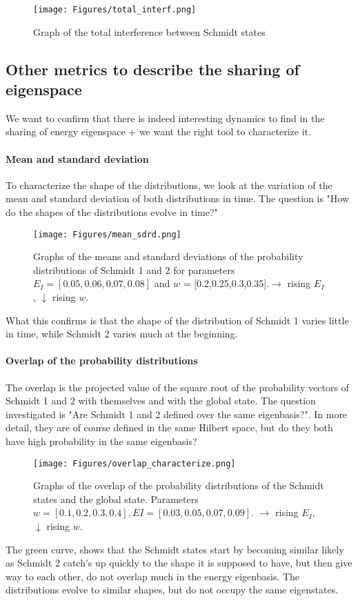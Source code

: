 \documentclass{article}
\begin{document}
\begin{figure}[h]
    \centering
    \texttt{[image: Figures/total\_interf.png]}
    \caption{Graph of the total interference between Schmidt states}
    \label{fig:total_interference}
\end{figure}

\newpage

\subsection{Other metrics to describe the sharing of eigenspace}
We want to confirm that there is indeed interesting dynamics to find in the sharing of energy eigenspace + we want the right tool to characterize it.

\paragraph{Mean and standard deviation}
To characterize the shape of the distributions, we look at the variation of the mean and standard deviation of both distributions in time. The question is "How do the shapes of the distributions evolve in time?"
\begin{figure}[h]
    \centering
    \texttt{[image: Figures/mean\_sdrd.png]}
    \caption{Graphs of the means and standard deviations of the probability distributions of Schmidt 1 and 2 for parameters $E_I=[0.05,0.06,0.07,0.08]$ and $w$ = [0.2,0.25,0.3,0.35].$\rightarrow$ rising $E_I$, $\downarrow$ rising $w$.}
    \label{fig:characteriazation_mean_stdr}
\end{figure}

What this confirms is that the shape of the distribution of Schmidt 1 varies little in time, while Schmidt 2 varies much at the beginning.

\paragraph{Overlap of the probability distributions}
The overlap is the projected value of the square root of the probability vectors of Schmidt 1 and 2 with themselves and with the global state. The question investigated is "Are Schmidt 1 and 2 defined over the same eigenbasis?". In more detail, they are of course defined in the same Hilbert space, but do they both have high probability in the same eigenbasis? 
\begin{figure}[h]
    \centering
    \texttt{[image: Figures/overlap\_characterize.png]}
    \caption{Graphs of the overlap of the probability distributions of the Schmidt states and the global state. Parameters $w=[0.1,0.2,0.3,0.4], EI=[0.03,0.05,0.07,0.09]$. $\rightarrow$ rising $E_I$, $\downarrow$ rising $w$.}
    \label{fig:characteriazation_overlap}
\end{figure}
The green curve, shows that the Schmidt states start by becoming similar likely as Schmidt 2 catch's up quickly to the shape it is supposed to have, but then give way to each other, do not overlap much in the energy eigenbasis. {\color{teal} The distributions evolve to similar shapes, but do not occupy the same eigenstates.}
\end{document}
